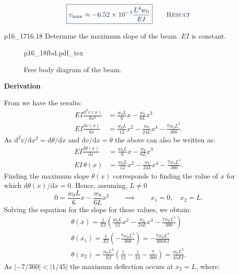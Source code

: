 \documentclass[a4paper]{article}
\newcommand{\incfig}[2][1]{%
  \def\svgwidth{#1\columnwidth}
  {#2.pdf_tex}
}
\newcounter{problem}
\numberwithin{equation}{problem}
\newcommand{\AUheading}[1]{%
  \par\vspace{.4\baselineskip}%
  {\sffamily\bfseries\color{AUblueDark}#1\par}%
  \nobreak%
}
\newenvironment{derivation}[1][Derivation]{%
  \AUheading{#1}
  \begingroup\allowdisplaybreaks
  \setlength{\abovedisplayskip}{6pt}%
  \setlength{\belowdisplayskip}{6pt}%
  \setlength{\abovedisplayshortskip}{4pt}%
  \setlength{\belowdisplayshortskip}{4pt}%
}{\par\endgroup\medskip}
\newcommand{\finalresult}[1]{%
  \vspace{.2\baselineskip}%
  \begin{equation}
    {\color{AUblueDark}\boxed{\displaystyle #1}}
    \tag*{\textsc{\textcolor{AUblueDark}{Result}}}
  \end{equation}
  \newpage
}
\begin{document}
\finalresult{
v_{\mathrm{max}} \approx \num{-6,52e-3} \frac{L^{4}w_0}{EI}
}

\begin{problemwithimage}[0.33\linewidth]{p16_17}{16.18}
  Determine the maximum slope of the beam.
  $EI$ is constant.
\end{problemwithimage}

\begin{figure}[ht]
    \centering
    \incfig[0.75]{p16_18fbd}
    \caption{Free body diagram of the beam.}
    \label{fig:p16_18fbd}
\end{figure}

\begin{derivation}
  From  we have the results:
  \begin{align*}
    EI \frac{\mathrm{d}^2 v(x)}{\mathrm{d}x^2} &= \frac{w_0 L}{6}x - \frac{w_0}{6 L}x^3 \\
    EI \frac{\mathrm{d}v(x)}{\mathrm{d}x} &= \frac{w_0 L}{12}x^2 - \frac{w_0}{24L}x^{4} - \frac{7 w_0 L^3}{360}
  .\end{align*}
  As $\mathrm{d}^2v / \mathrm{d}x^2 = \mathrm{d}\theta / \mathrm{d}x$ and $\mathrm{d}v / \mathrm{d}x = \theta$ the above can also be written as:
  \begin{align*}
    EI \frac{\mathrm{d}\theta(x)}{\mathrm{d}x} &= \frac{w_0 L}{6}x - \frac{w_0}{6 L}x^3 \\
    EI \,  \theta(x) &= \frac{w_0 L}{12}x^2 - \frac{w_0}{24L}x^{4} - \frac{7 w_0 L^3}{360}
  .\end{align*}
  Finding the maximum slope $\theta(x)$ corresponds to finding the value of $x$ for which $\mathrm{d}\theta(x) / \mathrm{d}x = 0$.
  Hence, assuming, $L \neq 0$
  \begin{equation*}
    0 = \frac{w_0 L}{6} x - \frac{w_0}{6 L} x^3 \qquad \implies \qquad x_1 = 0, \quad x_2 = L.   \end{equation*}
  Solving the equation for the slope for these values, we obtain:
  \begin{gather*}
    \theta (x) = \frac{1}{EI} \left( \frac{w_0 L}{12} x^2 - \frac{w_0}{24 L} x^{4} - \frac{7 w_0 L^3}{360} \right) \\
    \theta(x_1) = \frac{1}{EI} \left( - \frac{7 w_0 L^3}{360} \right) = - \frac{7 w_0 L^3}{360 EI} \\
    \theta(x_2) = \frac{w_0 L^3}{EI} \left( \frac{1}{12} - \frac{1}{24} - \frac{7}{360} \right) = \frac{w_0 L^3}{45 EI}
  .\end{gather*}
  As $\left| - 7 / 360 \right| < \left| 1 / 45 \right|$ the maximum deflection occurs at $x_2 = L$, where:
\end{derivation}
\end{document}
